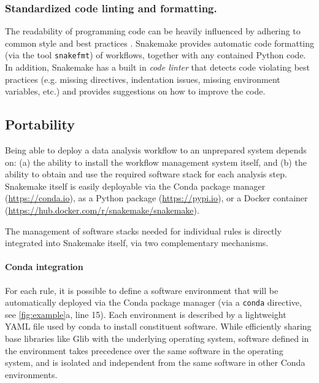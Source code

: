\documentclass[parskip=half, DIV=18]{scrartcl}
\let\plainurl\url
\renewcommand{\url}[1]{\protect\plainurl{#1}}
\begin{document}
\subsubsection{Standardized code linting and formatting.}\label{sec:style}

The readability of programming code can be heavily influenced by adhering to common style and best practices \parencite{tysell_sundkvist_code_2017}.
Snakemake provides automatic code formatting (via the tool \lstinline!snakefmt!) of workflows, together with any contained Python code.
In addition, Snakemake has a built in \emph{code linter} that detects code violating best practices (e.g. missing directives, indentation issues, missing environment variables, etc.) and provides suggestions on how to improve the code.

\subsection{Portability}\label{sec:portability}

Being able to deploy a data analysis workflow to an unprepared system depends on: (a) the ability to install the workflow management system itself, and (b) the ability to obtain and use the required software stack for each analysis step.
Snakemake itself is easily deployable via the Conda package manager (\url{https://conda.io}), as a Python package (\url{https://pypi.io}), or a Docker container (\url{https://hub.docker.com/r/snakemake/snakemake}).

The management of software stacks needed for individual rules is directly integrated into Snakemake itself, via two complementary mechanisms.

\paragraph{Conda integration}

For each rule, it is possible to define a software environment that will be automatically deployed via the Conda package manager (via a \lstinline!conda! directive, see \autoref{fig:example}a, line 15).
Each environment is described by a lightweight YAML file used by conda to install constituent software.
While efficiently sharing base libraries like Glib with the underlying operating system, software defined in the environment takes precedence over the same software in the operating system, and is isolated and independent from the same software in other Conda environments.
\end{document}
